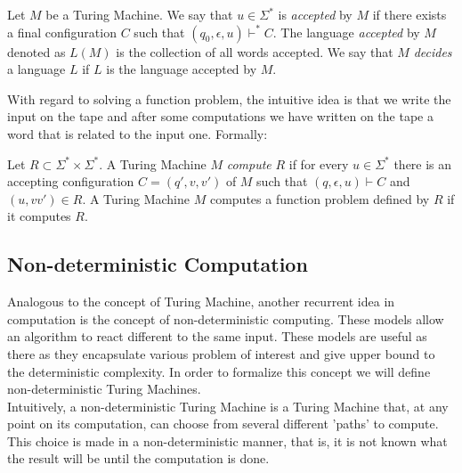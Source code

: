   \begin{definition}
     Let $M$ be a Turing Machine. We say that $u\in\Sigma^*$ is \emph{accepted} by $M$ if there exists a final configuration $C$ such that $(q_0,\epsilon,u)\vdash^* C$. The language \emph{accepted} by $M$ denoted as $L(M)$ is the collection of all words accepted. We say that $M$ \emph{decides} a language $L$ if $L$ is the language accepted by $M$.
  \end{definition}

  With regard to solving a function problem, the intuitive idea is that we write the input on the tape and after some computations we have written on the tape a word that is related to the input one. Formally:


  \begin{definition}
    Let $R\subset\Sigma^*\times \Sigma^*$. A Turing Machine $M$ \emph{compute} $R$ if for every $u\in \Sigma^*$ there is an accepting configuration $C=(q',v,v')$ of $M$  such that $(q,\epsilon,u)\vdash C$ and $(u,vv') \in R$. A Turing Machine $M$ computes a function problem defined by $R$ if it computes $R$.
  \end{definition}


  

  \subsection{Non-deterministic Computation}
Analogous to the concept of Turing Machine, another recurrent idea in computation is the concept of non-deterministic computing. These models allow an algorithm to react different to the same input. These models are useful as there as they encapsulate various problem of interest and give upper bound to the deterministic complexity. In order to formalize this concept we will define non-deterministic Turing Machines.\\

Intuitively, a non-deterministic Turing Machine is a Turing Machine that, at any point on its computation, can choose from several different 'paths' to compute. This choice is made in a non-deterministic manner, that is, it is not known what the result will be until the computation is done.

